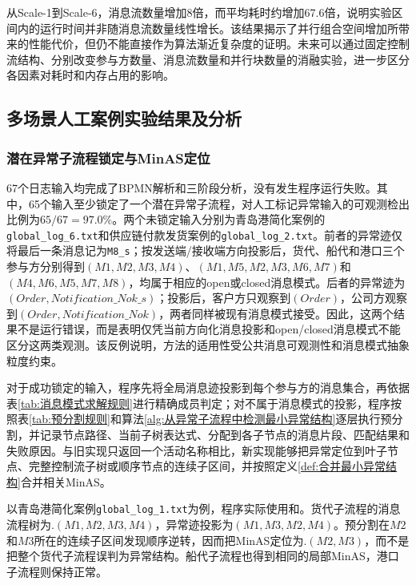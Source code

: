 从Scale-1到Scale-6，消息流数量增加8倍，而平均耗时约增加67.6倍，说明实验区间内的运行时间并非随消息流数量线性增长。该结果揭示了并行组合空间增加所带来的性能代价，但仍不能直接作为算法渐近复杂度的证明。未来可以通过固定控制流结构、分别改变参与方数量、消息流数量和并行块数量的消融实验，进一步区分各因素对耗时和内存占用的影响。




\subsection{多场景人工案例实验结果及分析}

\subsubsection{潜在异常子流程锁定与MinAS定位}

67个日志输入均完成了BPMN解析和三阶段分析，没有发生程序运行失败。其中，65个输入至少锁定了一个潜在异常子流程，对人工标记异常输入的可观测检出比例为$65/67=97.0\%$。两个未锁定输入分别为青岛港简化案例的\texttt{global\_log\_6.txt}和供应链付款发货案例的\texttt{global\_log\_2.txt}。前者的异常迹仅将最后一条消息记为\texttt{M8\_s}；按发送端/接收端方向投影后，货代、船代和港口三个参与方分别得到$(M1,M2,M3,M4)$、$(M1,M5,M2,M3,M6,M7)$和$(M4,M6,M5,M7,M8)$，均属于相应的open或closed消息模式。后者的异常迹为$(Order,Notification\_Nok\_s)$；投影后，客户方只观察到$(Order)$，公司方观察到$(Order,Notification\_Nok)$，两者同样被现有消息模式接受。因此，这两个结果不是运行错误，而是表明仅凭当前方向化消息投影和open/closed消息模式不能区分这两类观测。该反例说明，方法的适用性受公共消息可观测性和消息模式抽象粒度约束。

对于成功锁定的输入，程序先将全局消息迹投影到每个参与方的消息集合，再依据表\ref{tab:消息模式求解规则}进行精确成员判定；对不属于消息模式的投影，程序按照表\ref{tab:预分割规则}和算法\ref{alg:从异常子流程中检测最小异常结构}逐层执行预分割，并记录节点路径、当前子树表达式、分配到各子节点的消息片段、匹配结果和失败原因。与旧实现只返回一个活动名称相比，新实现能够把异常定位到叶子节点、完整控制流子树或顺序节点的连续子区间，并按照定义\ref{def:合并最小异常结构}合并相关MinAS。

以青岛港简化案例\texttt{global\_log\_1.txt}为例，程序实际使用和。货代子流程的消息流程树为$.(M1,M2,M3,M4)$，异常迹投影为$(M1,M3,M2,M4)$。预分割在$M2$和$M3$所在的连续子区间发现顺序逆转，因而把MinAS定位为$.(M2,M3)$，而不是把整个货代子流程误判为异常结构。船代子流程也得到相同的局部MinAS，港口子流程则保持正常。

